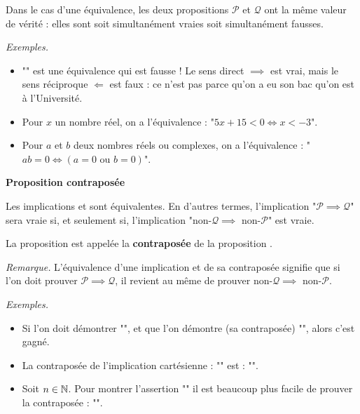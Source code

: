\documentclass[11pt,class=report,crop=false]{standalone}
\begin{document}
Dans le cas d'une équivalence, les deux propositions $\mathcal{P}$ et $\mathcal{Q}$ ont la même valeur de vérité : elles sont soit simultanément vraies soit simultanément fausses. 

\medskip

\emph{Exemples.}
\begin{itemize}
        \item "" est une équivalence qui est fausse ! Le sens direct $\implies$ est vrai, mais le sens réciproque $\Longleftarrow$ est faux : ce n'est pas parce qu'on a eu son bac qu'on est à l'Université.
        \item Pour $x$ un nombre réel, on a l'équivalence : "$5x+15<0 \iff x<-3$".
        \item Pour $a$ et $b$ deux nombres réels ou complexes, on a l'équivalence : "$ab=0 \iff (a=0 \text{ ou } b=0)$".
\end{itemize}


\bigskip

\textbf{Proposition contraposée}


Les implications  \; et \;  sont équivalentes. En d'autres termes, l'implication "$\mathcal{P} \implies \mathcal{Q}$" sera vraie si, et seulement si, l'implication "non-$\mathcal{Q} \implies $ non-$\mathcal{P}$" est vraie.

La proposition  est appelée la \textbf{contraposée} de la proposition .

\emph{Remarque.}
L'équivalence d'une implication et de sa contraposée signifie que si l'on doit prouver $\mathcal{P} \implies \mathcal{Q}$, il revient au même de prouver non-$\mathcal{Q} \implies $ non-$\mathcal{P}$.


\emph{Exemples.}

\begin{itemize}
     \item Si l'on doit démontrer "", et que l'on démontre (sa contraposée) "", alors c'est gagné.
     
     \item La contraposée de l'implication cartésienne : "" est : "". 
     
     \item Soit $n \in \mathbb{N}$. Pour montrer l'assertion "" il est beaucoup plus facile de prouver la  contraposée : "".
\end{itemize}  
\end{document}
